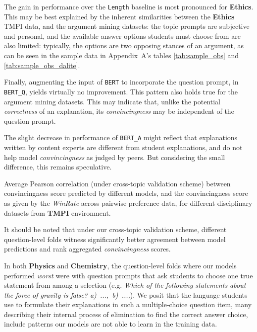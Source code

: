 \documentclass[notitlepage,12pt]{jedm}
\begin{document}
The gain in performance over the \verb|Length| baseline is most pronounced for 
\textbf{Ethics}.
This may be best explained by the inherent similarities between the 
\textbf{Ethics} TMPI data, and the argument mining datasets: the topic prompts 
are subjective and personal, and the available answer options students must 
choose from are also limited: typically, the options are two opposing stances of 
an argument, as can be seen in the sample data in Appendix~A's tables \ref{tab:sample_obs} 
and \ref{tab:sample_obs_dalite}. 

Finally, augmenting the input of \verb|BERT| to incorporate the question 
prompt, in \verb|BERT_Q|, yields virtually no improvement.
This pattern also holds true for the argument mining datasets.
This may indicate that, unlike the potential \textit{correctness} of an
explanation, its \textit{convincingness} may be independent of the question 
prompt.

The slight decrease in performance of \verb|BERT_A| might reflect that 
explanations written by content experts are different from 
student explanations, and do not help model \textit{convincingness} as judged 
by peers.  But considering the small difference, this remains speculative.

\begin{table}
	\caption{
	Average Pearson correlation (under cross-topic validation scheme) between 
	convincingness score predicted by different models, and the 
	convincingness score as given by the \textit{WinRate} across pairwise 
	preference data, for different disciplinary datasets from \textbf{TMPI} 
	environment.
	}
	\label{tab:dalite_results}
	\parbox{.45\linewidth}{
	\centering
	
	}
\end{table}

It should be noted that under our cross-topic validation scheme, different 
question-level folds witness significantly better agreement between model 
predictions and rank aggregated \textit{convincingness} scores.

In both \textbf{Physics} and \textbf{Chemistry}, the question-level folds where 
our models performed \textit{worst} were with question prompts that ask 
students to choose one true statement from among a selection (e.g. 
\textit{Which of the following statements about the force of gravity is 
false? \mbox{a) ..., b) ...,}}).
We posit that the language students use to formulate their explanations in such 
a multiple-choice question item, many describing their internal process of 
elimination to find the correct answer choice, include patterns our models are 
not able to learn in the training data.
\end{document}

